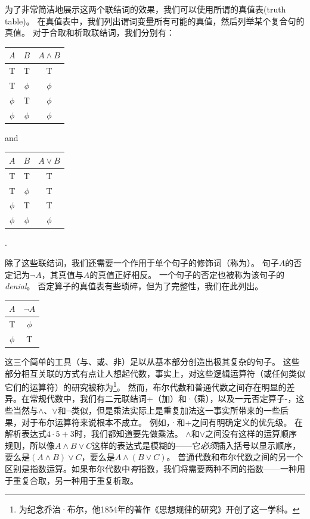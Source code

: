 为了非常简洁地展示这两个联结词的效果，我们可以使用所谓的真值表(truth table)。
在真值表中，我们列出谓词变量所有可能的真值，然后列举某个复合句的真值。
对于合取和析取联结词，我们分别有：

\begin{center}
\begin{tabular}{c|c||c}
\; $A$ \; & \; $B$ \; & \; $A \land B$ \; \\ \hline
T & T & T \\
T & $\phi$ & $\phi$\\
 $\phi$ & T & $\phi$\\
 $\phi$ &  $\phi$ & $\phi$\\
\end{tabular}
\hspace{.25in}and\hspace{.25in}
\begin{tabular}{c|c||c}
\; $A$ \; & \; $B$ \; & \; $A \lor B$ \; \\ \hline
T & T & T \\
T & $\phi$ & T\\
 $\phi$ & T & T\\
 $\phi$ &  $\phi$ & $\phi$\\
\end{tabular}.
\end{center}


除了这些联结词，我们还需要一个作用于单个句子的修饰词（称为）。
句子$A$的否定记为${\lnot}A$，其真值与$A$的真值正好相反。
一个句子的否定也被称为该句子的\emph{denial}。
否定算子的真值表有些琐碎，但为了完整性，我们在此列出。

\begin{center}
\begin{tabular}{c||c}
\; $A$ \; &  \; ${\lnot}A$ \; \\ \hline
 T & $\phi$ \\
 $\phi$ & T \\
\end{tabular}
\end{center}

这三个简单的工具（与、或、非）足以从基本部分创造出极其复杂的句子。
这些部分相互关联的方式有点让人想起代数，事实上，对这些逻辑运算符（或任何类似它们的运算符）的研究被称为\footnote{为纪念乔治·布尔，他1854年的著作《思想规律的研究》开创了这一学科。}。
然而，布尔代数和普通代数之间存在明显的差异。在常规代数中，我们有二元联结词+（加）和·（乘），以及一元否定算子-，这些当然与$\land$、$\lor$和$\lnot$类似，但是乘法实际上是重复加法这一事实所带来的一些后果，对于布尔运算符来说根本不成立。
例如，·和+之间有明确定义的优先级。
在解析表达式$4 \cdot 5 + 3$时，我们都知道要先做乘法。
$\land$和$\lor$之间没有这样的运算顺序规则，所以像$A \land B \lor C$这样的表达式是模糊的——它{\em 必须}插入括号以显示顺序，要么是$(A \land B) \lor C$，要么是$A \land (B \lor C)$。
普通代数和布尔代数之间的另一个区别是指数运算。如果布尔代数中{\em 有}指数，我们将需要两种不同的指数——一种用于重复合取，另一种用于重复析取。


